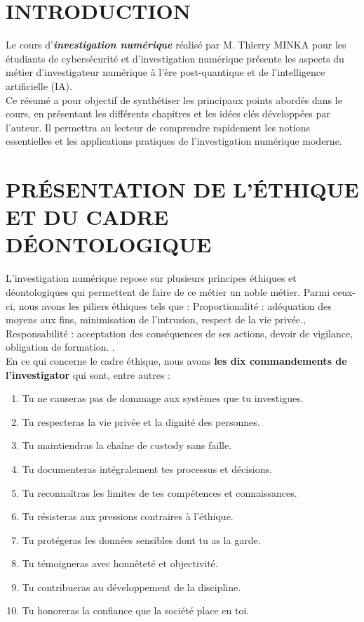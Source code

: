 \documentclass[12pt,a4paper]{article}
\begin{document}
	\newpage
	\section*{INTRODUCTION}
	Le cours d'\textbf{\emph{investigation numérique}} réalisé par M. Thierry MINKA pour les étudiants de cybersécurité et d'investigation numérique présente les aspects du métier d'investigateur numérique à l'ère post-quantique et de l'intelligence artificielle (IA).\\
	Ce résumé a pour objectif de synthétiser les principaux points abordés dans le cours, en présentant les différents chapitres et les idées clés développées par l'auteur. Il permettra au lecteur de comprendre rapidement les notions essentielles et les applications pratiques de l'investigation numérique moderne.\\
	
	\newpage
	\section{PRÉSENTATION DE L'ÉTHIQUE ET DU CADRE DÉONTOLOGIQUE}
	L'investigation numérique repose sur plusieurs principes éthiques et déontologiques qui permettent de faire de ce métier un noble métier. Parmi ceux-ci, nous avons les piliers éthiques tels que : \og Proportionalité : adéquation des moyens aux fins, minimisation de l’intrusion, respect de la vie privée.\fg , \og Responsabilité : acceptation des conséquences de ses actions, devoir de vigilance, obligation de formation. \fg . \\
	En ce qui concerne le cadre éthique, nous avons \textbf{les dix commandements de l'investigator} qui sont, entre autres :\\
	\begin{enumerate}
		\item Tu ne causeras pas de dommage aux systèmes que tu investigues. \\
		\item Tu respecteras la vie privée et la dignité des personnes. \\
		\item Tu maintiendras la chaîne de custody sans faille.  \\
		\item Tu documenteras intégralement tes processus et décisions. \\
		\item Tu reconnaîtras les limites de tes compétences et connaissances. \\
		\item Tu résisteras aux pressions contraires à l’éthique. \\
		\item Tu protégeras les données sensibles dont tu as la garde.  \\
		\item Tu témoigneras avec honnêteté et objectivité. \\
		\item Tu contribueras au développement de la discipline. \\
		\item Tu honoreras la confiance que la société place en toi. \\
	\end{enumerate}
	
\end{document}
